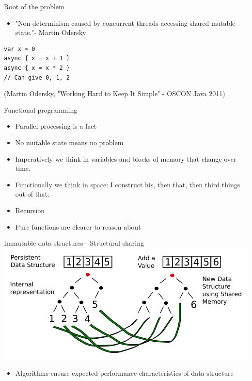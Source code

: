 \documentclass[presentation]{beamer}
\begin{document}
\begin{frame}[fragile,label=sec-3-2]{Root of the problem}
 \begin{itemize}
\item "\alert{Non-determinism} caused by \alert{concurrent threads} accessing \alert{shared mutable} state."- Martin Odersky
\end{itemize}

\begin{verbatim}
var x = 0
async { x = x + 1 }
async { x = x * 2 }
// Can give 0, 1, 2
\end{verbatim}
(Martin Odersky, "Working Hard to Keep It Simple" - OSCON Java 2011)
\end{frame}

\begin{frame}[label=sec-3-3]{Functional programming}
\begin{itemize}
\item Parallel processing is a fact
\item No mutable state means no problem
\item Imperatively we think in variables and blocks of memory that change over \alert{time}.
\item Functionally we think in \alert{space}: I construct his, then that, then third things out of that.
\item Recursion
\item \alert{Pure functions} are clearer to reason about
\end{itemize}
\end{frame}
\begin{frame}[label=sec-3-4]{Immutable data structures - Structural sharing}
\includegraphics[width=.9\linewidth]{../images/immutable_data_structures.png}
\begin{itemize}
\item Algorithms ensure expected performance characteristics of data structure
\end{itemize}
\end{frame}
\end{document}
